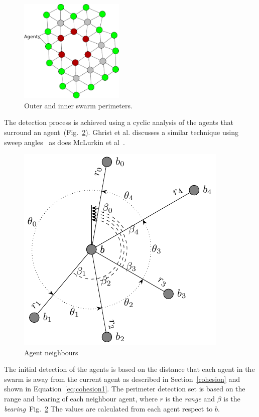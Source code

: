 \documentclass[12pt,a4paper]{IEEEtran}
\begin{document}
\begin{figure}[H]
	\begin{center}
		\includegraphics[width=5cm]{figures/PerimeterBots1}
	\end{center}
	\caption{{\color{green}Outer} and {\color{red}inner} swarm perimeters. \label{fig:innerOuterPerimeters}}
\end{figure}

The detection process is achieved using a cyclic analysis of the agents that surround an agent~(Fig.~\ref{fig:neighbours}). Ghrist et al. discusses a similar technique using sweep angles~\cite{ghrist2008surrounding} as does McLurkin et al~\cite{mclurkin2009}. 

\begin{figure}[H]
	\centering
	\includegraphics[width=0.8\linewidth]{figures/neighbours}
	\caption[Agent neighbours]{Agent neighbours}
	\label{fig:neighbours}
\end{figure}

The initial detection of the agents is based on the distance that each agent in the swarm is away from the current agent as described in Section~\ref{cohesion} and shown in Equation~\ref{eq:cohesion1}. The perimeter detection set is based on the range and bearing of each neighbour agent, where $r$ is the \textit{range} and $\beta$ is the \textit{bearing}~Fig.~\ref{fig:neighbours} The values are calculated  from each agent respect to $b$.
\end{document}

